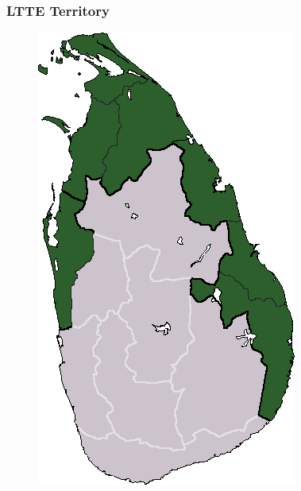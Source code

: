 \documentclass[handout]{beamer}
\begin{document}
\begin{frame} 
	\frametitle{\LARGE{LTTE Territory}}
	\begin{figure}[ht!]
		\centering
		\includegraphics[width=\textwidth,height=0.9\textheight,keepaspectratio]{LTTEterritory.png}
	\end{figure}
\end{frame}
\end{document}

